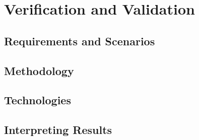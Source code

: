 \chapter{Verification and Validation}
\label{chapter:v_and_v}

\section{Requirements and Scenarios}
\section{Methodology}
\section{Technologies}
\section{Interpreting Results}
